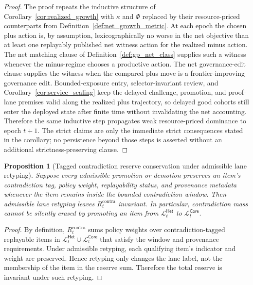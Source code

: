 \documentclass[11pt]{article}
\newtheorem{proposition}[theorem]{Proposition}
\theoremstyle{definition}
\newcommand{\1}{\mathbf{1}}
\newcommand{\Core}{\mathsf{Core}}
\newcommand{\Het}{\mathsf{Het}}
\begin{document}
\begin{proof}
The proof repeats the inductive structure of Corollary~\ref{cor:realized_growth} with $\kappa$ and $\Phi$ replaced by their resource-priced counterparts from Definition~\ref{def:net_growth_metric}. At each epoch the chosen plus action is, by assumption, lexicographically no worse in the net objective than at least one replayably published net witness action for the realized minus action. The net matching clause of Definition~\ref{def:gp_net_class} supplies such a witness whenever the minus-regime chooses a productive action. The net governance-edit clause supplies the witness when the compared plus move is a frontier-improving governance edit. Bounded-exposure entry, selector-invariant review, and Corollary~\ref{cor:service_scaling} keep the delayed challenge, promotion, and proof-lane premises valid along the realized plus trajectory, so delayed good cohorts still enter the deployed state after finite time without invalidating the net accounting. Therefore the same inductive step propagates weak resource-priced dominance to epoch $t+1$. The strict claims are only the immediate strict consequences stated in the corollary; no persistence beyond those steps is asserted without an additional strictness-preserving clause.
\end{proof}

\begin{proposition}[Tagged contradiction reserve conservation under admissible lane retyping]\label{prop:reserve_conservation}
Suppose every admissible promotion or demotion preserves an item's contradiction tag, policy weight, replayability status, and provenance metadata whenever the item remains inside the bounded contradiction window. Then admissible lane retyping leaves $R_t^{\mathrm{contra}}$ invariant. In particular, contradiction mass cannot be silently erased by promoting an item from $\mathcal L_t^{\Het}$ to $\mathcal L_t^{\Core}$.
\end{proposition}

\begin{proof}
By definition, $R_t^{\mathrm{contra}}$ sums policy weights over contradiction-tagged replayable items in $\mathcal L_t^{\Het}\cup\mathcal L_t^{\Core}$ that satisfy the window and provenance requirements. Under admissible retyping, each qualifying item's indicator and weight are preserved. Hence retyping only changes the lane label, not the membership of the item in the reserve sum. Therefore the total reserve is invariant under such retyping.
\end{proof}
\end{document}
